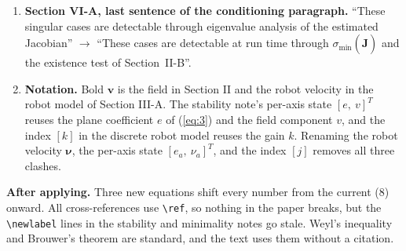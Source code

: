 \documentclass[10pt]{article}
\begin{document}
\begin{enumerate}
\begin{quote}
With white measurement noise of 0.02~m/s added to every reading, the type of $\hat{\mathbf{J}}$ matched the true type on 100\% of cycles for saddles, 96--97\% for spirals, 95--96\% for the star nodes (100\% for attracting against repelling), and 90\% for the center, falling to 64--65\% on the reconstructed vortex.
\end{quote}
This item affects the queued \texttt{Queued\_Edits/prose\_framing\_batch.tex}:
\begin{itemize}
\item Its item~3 says ``the present experiments evaluate location only''. That must change if the new campaign reports classification, since the campaign logs $\hat{\mathbf{J}}$ and a type label every cycle.
\item Its item~7 (metric definitions) then needs the classification metric: the fraction of cycles on which the type of $\hat{\mathbf{J}}$ matches the true type.
\end{itemize}
\item \textbf{Section VI-A, last sentence of the conditioning paragraph.} ``These singular cases are detectable through eigenvalue analysis of the estimated Jacobian'' $\to$ ``These cases are detectable at run time through $\sigma_{\min}(\hat{\mathbf{J}})$ and the existence test of Section~II-B''.
\item \textbf{Notation.} Bold $\mathbf{v}$ is the field in Section II and the robot velocity in the robot model of Section III-A. The stability note's per-axis state $[e,\ v]^T$ reuses the plane coefficient $e$ of (\ref{eq:3}) and the field component $v$, and the index $[k]$ in the discrete robot model reuses the gain $k$. Renaming the robot velocity $\boldsymbol{\nu}$, the per-axis state $[e_a,\ \nu_a]^T$, and the index $[j]$ removes all three clashes.
\end{enumerate}

\noindent\textbf{After applying.} Three new equations shift every number from the current (8) onward. All cross-references use \verb|\ref|, so nothing in the paper breaks, but the \verb|\newlabel| lines in the stability and minimality notes go stale. Weyl's inequality and Brouwer's theorem are standard, and the text uses them without a citation.
\end{document}
